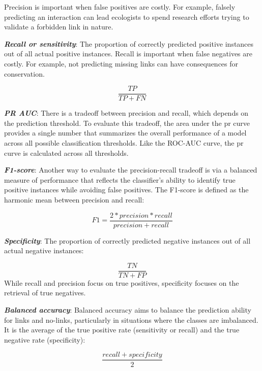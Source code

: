 \documentclass[oneside, a4paper, onecolumn, 11pt]{article}
\begin{document}
\begin{refsection}
Precision is important when false positives are costly. For example, falsely predicting an interaction can lead ecologists to spend research efforts trying to validate a forbidden link in nature.

\textbf{\textit{Recall or sensitivity}}: The proportion of correctly predicted positive instances out of all actual positive instances. Recall is important when false negatives are costly. For example, not predicting missing links can have consequences for conservation.

\begin{equation}
    \frac{TP}{TP+FN}
\end{equation}

\textbf{\textit{PR AUC}}: There is a tradeoff between precision and recall, which depends on the prediction threshold. To evaluate this tradeoff, the area under the \ac{pr} curve provides a single number that summarizes the overall performance of a model across all possible classification thresholds. Like the ROC-AUC curve, the \ac{pr} curve is calculated across all thresholds.

\textbf{\textit{F1-score}}: Another way to evaluate the precision-recall tradeoff is via a balanced measure of performance that reflects the classifier's ability to identify true positive instances while avoiding false positives. The F1-score is defined as the harmonic mean between precision and recall:

\begin{equation}
F1=\frac{2*precision*recall}{precision+recall}    
\end{equation}

\textbf{\textit{Specificity}}: The proportion of correctly predicted negative instances out of all actual negative instances:

\begin{equation}
    \frac{TN}{TN+FP}
\end{equation}
While recall and precision focus on true positives, specificity focuses on the retrieval of true negatives.

\textbf{\textit{Balanced accuracy}}: Balanced accuracy aims to balance the prediction ability for links and no-links, particularly in situations where the classes are imbalanced. It is the average of the true positive rate (sensitivity or recall) and the true negative rate (specificity):

\begin{equation}
    \frac{recall+specificity}{2}
\end{equation}


\end{refsection}
\end{document}
